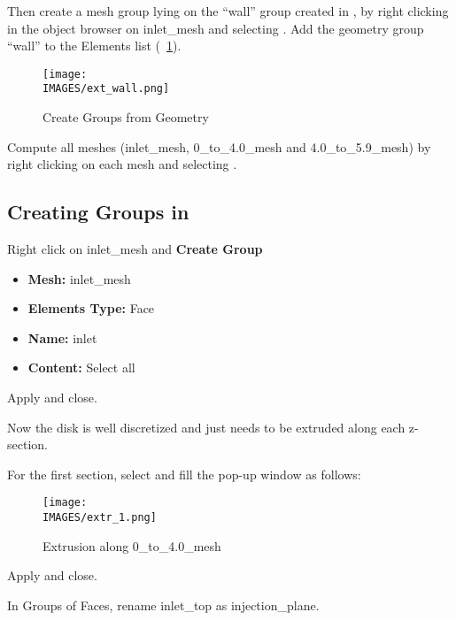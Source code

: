 Then create a mesh group lying on the ``wall'' group created in \geom, by right clicking in the object browser on inlet\_mesh
and selecting . Add the geometry group ``wall'' to the Elements list (\figurename~\ref{lag:ext_wall}).
%
\begin{figure}[H]
	\centering
	\texttt{[image: \\IMAGES/ext\_wall.png]}
	\caption{Create Groups from Geometry}
	\label{lag:ext_wall}
\end{figure}
%
Compute all meshes (inlet\_mesh, 0\_to\_4.0\_mesh and 4.0\_to\_5.9\_mesh) by right clicking on each mesh and selecting .
%
\subsection{Creating Groups in \smesh}
%
Right click on inlet\_mesh and \textbf{Create Group}
%
\begin{itemize}
	\item \textbf{Mesh:} inlet\_mesh
	\item \textbf{Elements Type:} Face
	\item \textbf{Name:} inlet
	\item \textbf{Content:} Select all
\end{itemize}
%
Apply and close.

Now the disk is well discretized and just needs to be extruded along each z-section.

For the first section, select  and fill the pop-up window as follows:
%
\begin{figure}[H]
	\centering
	\texttt{[image: \\IMAGES/extr\_1.png]}
	\caption{Extrusion along 0\_to\_4.0\_mesh}
	\label{lag:extr_1}
\end{figure}
%
Apply and close.

In Groups of Faces, rename inlet\_top as injection\_plane.

